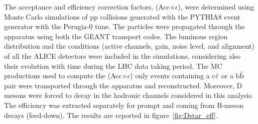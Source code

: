 The acceptance and efficiency correction factors, (Acc$\times \epsilon$), were determined using Monte Carlo simulations of pp collisions generated with the PYTHIA8 event generator with the Perugia-0 tune. The particles were propagated through the apparatus using both the GEANT transport codes. The luminous region distribution and the conditions (active channels, gain, noise level, and alignment) of all the ALICE detectors were included in the simulations, considering also their evolution with time during the LHC data taking period. The MC productions used to compute the (Acc$\times \epsilon$) only events containing a c$\bar{\rm c}$ or a b$\bar{\rm b}$ pair were transported through the apparatus and reconstructed. Moreover, D mesons were forced to decay in the hadronic channels considered in this analysis. The efficiency was extracted separately for prompt \Dstar and \Dstar
coming from B-meson decays (feed-down). The results are reported in figure~\ref{fig:Dstar_eff}.





